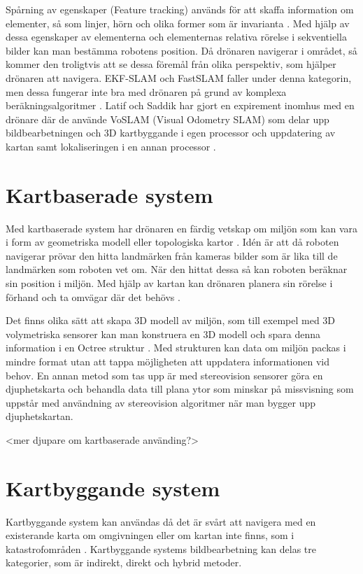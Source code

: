 Spårning av egenskaper (Feature tracking) används för att skaffa information om elementer, så som linjer, hörn och olika former som är invarianta \citep{geospatial}. Med hjälp av dessa egenskaper av elementerna och elementernas relativa rörelse i sekventiella bilder kan man bestämma robotens position. Då drönaren navigerar i området, så kommer den troligtvis att se dessa föremål från olika perspektiv, som hjälper drönaren att navigera. EKF-SLAM och FastSLAM faller under denna kategorin, men dessa fungerar inte bra med drönaren på grund av komplexa beräkningsalgoritmer \cite{8930783}. Latif och Saddik har gjort en expirement inomhus med en drönare där de använde VoSLAM (Visual Odometry SLAM) som delar upp bildbearbetningen och 3D kartbyggande i egen processor och uppdatering av kartan samt lokaliseringen i en annan processor \citep{8930783}.

\section{Kartbaserade system}

Med kartbaserade system har drönaren en färdig vetskap om miljön som kan vara i form av geometriska modell eller topologiska kartor \citep{982903}. Idén är att då roboten navigerar prövar den hitta landmärken från kameras bilder som är lika till de landmärken som roboten vet om. När den hittat dessa så kan roboten beräknar sin position i miljön. Med hjälp av kartan kan drönaren planera sin rörelse i förhand och ta omvägar där det behövs \citep{geospatial}. 

Det finns olika sätt att skapa 3D modell av miljön, som till exempel med 3D volymetriska sensorer kan man konstruera en 3D modell och spara denna information i en Octree struktur \citep{geospatial}. Med strukturen kan data om miljön packas i mindre format utan att tappa möjligheten att uppdatera informationen vid behov. En annan metod som tas upp är med stereovision sensorer göra en djuphetskarta och behandla data till plana ytor som minskar på missvisning som uppstår med användning av stereovision algoritmer när man bygger upp djuphetskartan.

<mer djupare om kartbaserade använding?>

\section{Kartbyggande system}

Kartbyggande system kan användas då det är svårt att navigera med en existerande karta om omgivningen eller om kartan inte finns, som i katastrofområden \citep{geospatial}. Kartbyggande systems bildbearbetning kan delas tre kategorier, som är indirekt, direkt och hybrid metoder.

